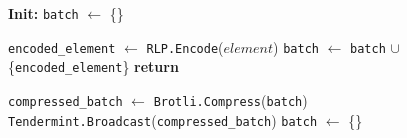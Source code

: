 \begin{figure}[t!]
  \begin{adjustbox}{minipage=[t]{\columnwidth}}
    \begin{algorithm}[H]
      \renewcommand{\thealgorithm}{Compress Collector}         
      \caption{}%
      \label{alg:collector-brotli}%
      \small
      \begin{algorithmic}[1]
            \State \textbf{Init:} \texttt{batch} $\leftarrow$ \{\}
      
            \label{alg:brotli_add_tx}
            			\State \texttt{encoded\_element} $\leftarrow$ \texttt{RLP.Encode}($element$)
					        \State \texttt{batch} $\leftarrow$ \texttt{batch} $\cup$ \{\texttt{encoded\_element}\}
                \EndIf
                \State \textbf{return}
            \EndFunction
            
            \smallskip

              \State \texttt{compressed\_batch} $\leftarrow$  \texttt{Brotli.Compress}(\texttt{batch})
              \State \texttt{Tendermint.Broadcast}(\texttt{compressed\_batch}) \label{line:compresschain-broadcast}
              \State \texttt{batch} $\leftarrow$ \{\}
            \EndWhen
            
        \end{algorithmic}
      \end{algorithm}
	\end{adjustbox}
  \end{figure}

